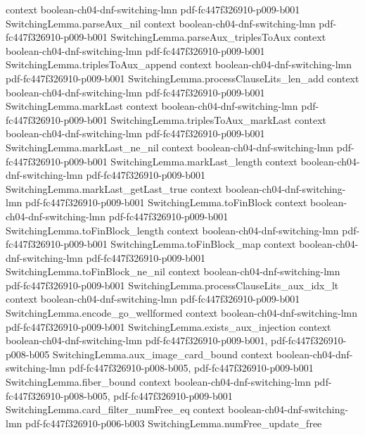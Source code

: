\begin{theorem}
  {context}
  {boolean-ch04-dnf-switching-lmn}
  {pdf-fc447f326910-p009-b001}
\proofstep
  {SwitchingLemma.parseAux_nil}
  {context}
  {boolean-ch04-dnf-switching-lmn}
  {pdf-fc447f326910-p009-b001}
\proofstep
  {SwitchingLemma.parseAux_triplesToAux}
  {context}
  {boolean-ch04-dnf-switching-lmn}
  {pdf-fc447f326910-p009-b001}
\proofstep
  {SwitchingLemma.triplesToAux_append}
  {context}
  {boolean-ch04-dnf-switching-lmn}
  {pdf-fc447f326910-p009-b001}
\proofstep
  {SwitchingLemma.processClauseLits_len_add}
  {context}
  {boolean-ch04-dnf-switching-lmn}
  {pdf-fc447f326910-p009-b001}
\proofstep
  {SwitchingLemma.markLast}
  {context}
  {boolean-ch04-dnf-switching-lmn}
  {pdf-fc447f326910-p009-b001}
\proofstep
  {SwitchingLemma.triplesToAux_markLast}
  {context}
  {boolean-ch04-dnf-switching-lmn}
  {pdf-fc447f326910-p009-b001}
\proofstep
  {SwitchingLemma.markLast_ne_nil}
  {context}
  {boolean-ch04-dnf-switching-lmn}
  {pdf-fc447f326910-p009-b001}
\proofstep
  {SwitchingLemma.markLast_length}
  {context}
  {boolean-ch04-dnf-switching-lmn}
  {pdf-fc447f326910-p009-b001}
\proofstep
  {SwitchingLemma.markLast_getLast_true}
  {context}
  {boolean-ch04-dnf-switching-lmn}
  {pdf-fc447f326910-p009-b001}
\proofstep
  {SwitchingLemma.toFinBlock}
  {context}
  {boolean-ch04-dnf-switching-lmn}
  {pdf-fc447f326910-p009-b001}
\proofstep
  {SwitchingLemma.toFinBlock_length}
  {context}
  {boolean-ch04-dnf-switching-lmn}
  {pdf-fc447f326910-p009-b001}
\proofstep
  {SwitchingLemma.toFinBlock_map}
  {context}
  {boolean-ch04-dnf-switching-lmn}
  {pdf-fc447f326910-p009-b001}
\proofstep
  {SwitchingLemma.toFinBlock_ne_nil}
  {context}
  {boolean-ch04-dnf-switching-lmn}
  {pdf-fc447f326910-p009-b001}
\proofstep
  {SwitchingLemma.processClauseLits_aux_idx_lt}
  {context}
  {boolean-ch04-dnf-switching-lmn}
  {pdf-fc447f326910-p009-b001}
\proofstep
  {SwitchingLemma.encode_go_wellformed}
  {context}
  {boolean-ch04-dnf-switching-lmn}
  {pdf-fc447f326910-p009-b001}
\proofstep
  {SwitchingLemma.exists_aux_injection}
  {context}
  {boolean-ch04-dnf-switching-lmn}
  {pdf-fc447f326910-p009-b001,
    pdf-fc447f326910-p008-b005}
\proofstep
  {SwitchingLemma.aux_image_card_bound}
  {context}
  {boolean-ch04-dnf-switching-lmn}
  {pdf-fc447f326910-p008-b005,
    pdf-fc447f326910-p009-b001}
\proofstep
  {SwitchingLemma.fiber_bound}
  {context}
  {boolean-ch04-dnf-switching-lmn}
  {pdf-fc447f326910-p008-b005,
    pdf-fc447f326910-p009-b001}
\proofstep
  {SwitchingLemma.card_filter_numFree_eq}
  {context}
  {boolean-ch04-dnf-switching-lmn}
  {pdf-fc447f326910-p006-b003}
\proofstep
  {SwitchingLemma.numFree_update_free}

\end{theorem}
